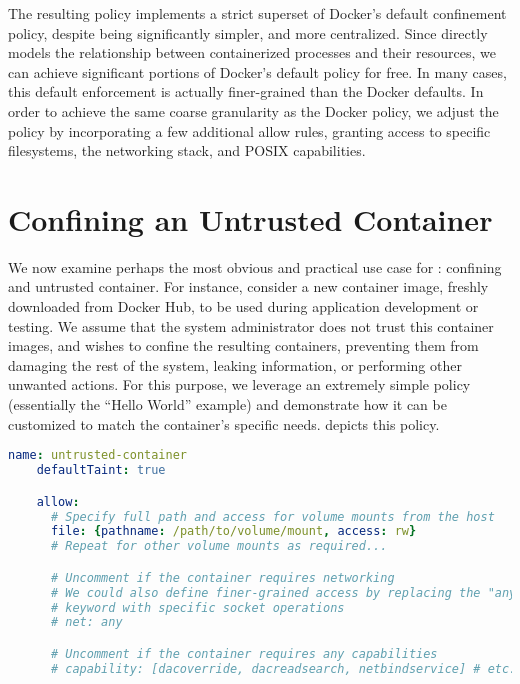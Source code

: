 The resulting \bpfcontain{} policy implements a strict superset of Docker's default
confinement policy, despite being significantly simpler, and more centralized.  Since
\bpfcontain{} directly models the relationship between containerized processes and their
resources, we can achieve significant portions of Docker's default policy for free. In
many cases, this default enforcement is actually finer-grained than the Docker defaults.
In order to achieve the same coarse granularity as the Docker policy, we adjust the
\bpfcontain{} policy by incorporating a few additional allow rules, granting access to
specific filesystems, the networking stack, and POSIX capabilities.

\section{Confining an Untrusted Container}

We now examine perhaps the most obvious and practical use case for \bpfcontain{}:
confining and untrusted container. For instance, consider a new container image, freshly
downloaded from Docker Hub, to be used during application development or testing.  We
assume that the system administrator does not trust this container images, and wishes to
confine the resulting containers, preventing them from damaging the rest of the system,
leaking information, or performing other unwanted actions. For this purpose, we leverage
an extremely simple \bpfcontain{} policy (essentially the \enquote{Hello World} example)
and demonstrate how it can be customized to match the container's specific needs.
 depicts this policy.

\begin{lstlisting}[language=yaml, gobble=4,
  caption={[Confining an untrusted container with \bpfcontain{}]
    Confining an untrusted container with \bpfcontain{}.
    %\bpfcontain{}'s default
    %enforcement policy of defining a boundary around the container enables this policy to
    %be quite simple. A default-tainted policy enables container-level confinement without
    %specifying \textit{any} rules whatsoever. This policy can then be adjusted as
    %required, specifying file rules to provision access to volume mounts, network rules to
    %enable networking, and capability rules to enable access to specific POSIX
    %capabilities.
  },
  label={lst:bpfcontain-untrusted}, float]
    name: untrusted-container
    defaultTaint: true

    allow:
      # Specify full path and access for volume mounts from the host
      file: {pathname: /path/to/volume/mount, access: rw}
      # Repeat for other volume mounts as required...

      # Uncomment if the container requires networking
      # We could also define finer-grained access by replacing the "any"
      # keyword with specific socket operations
      # net: any

      # Uncomment if the container requires any capabilities
      # capability: [dacoverride, dacreadsearch, netbindservice] # etc.
\end{lstlisting}

